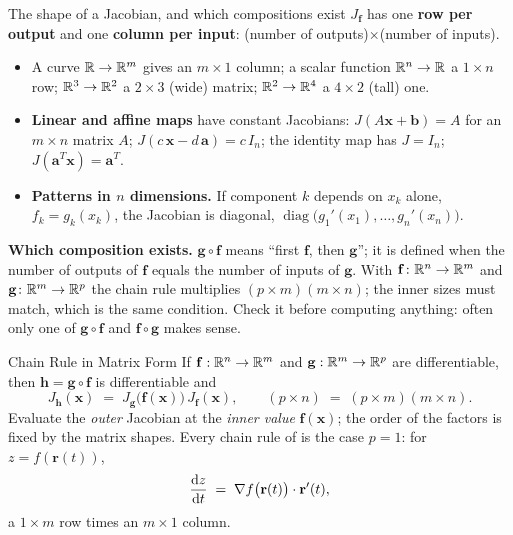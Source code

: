 \begin{rulebox}{The shape of a Jacobian, and which compositions exist}
$J_{\mathbf{f}}$ has one \textbf{row per output} and one \textbf{column per
input}: (number of outputs)$\times$(number of inputs).
\begin{itemize}[leftmargin=1.6em,itemsep=0.3ex]
  \item A curve $\mathbb{R}\to\mathbb{R}^{m}$ gives an $m\times1$ column; a scalar function
        $\mathbb{R}^{n}\to\mathbb{R}$ a $1\times n$ row; $\mathbb{R}^{3}\to\mathbb{R}^{2}$ a $2\times3$
        (wide) matrix; $\mathbb{R}^{2}\to\mathbb{R}^{4}$ a $4\times2$ (tall) one.
  \item \textbf{Linear and affine maps} have constant Jacobians:
        $J(A\mathbf{x}+\mathbf{b})=A$ for an $m\times n$ matrix $A$;
        $J(c\,\mathbf{x}-d\,\mathbf{a})=c\,I_{n}$; the identity map has
        $J=I_{n}$; $J(\mathbf{a}^{T}\mathbf{x})=\mathbf{a}^{T}$.
  \item \textbf{Patterns in $n$ dimensions.} If component $k$ depends on
        $x_{k}$ alone, $f_{k}=g_{k}(x_{k})$, the Jacobian is diagonal,
        $\operatorname{diag}\bigl(g_{1}'(x_{1}),\ldots,g_{n}'(x_{n})\bigr)$.
\end{itemize}
\textbf{Which composition exists.} $\mathbf{g}\circ\mathbf{f}$ means
``first $\mathbf{f}$, then $\mathbf{g}$''; it is defined when the number of
outputs of $\mathbf{f}$ equals the number of inputs of $\mathbf{g}$. With
$\mathbf{f}\colon\mathbb{R}^{n}\to\mathbb{R}^{m}$ and $\mathbf{g}\colon\mathbb{R}^{m}\to\mathbb{R}^{p}$ the
chain rule multiplies $(p\times m)(m\times n)$; the inner sizes must
match, which is the same condition. Check it before computing anything:
often only one of $\mathbf{g}\circ\mathbf{f}$ and $\mathbf{f}\circ\mathbf{g}$
makes sense.
\end{rulebox}

\begin{rulebox}{Chain Rule in Matrix Form}
If $\mathbf{f}:\mathbb{R}^{n}\to\mathbb{R}^{m}$ and $\mathbf{g}:\mathbb{R}^{m}\to\mathbb{R}^{p}$ are
differentiable, then $\mathbf{h}=\mathbf{g}\circ\mathbf{f}$ is
differentiable and
\[
  J_{\mathbf{h}}(\mathbf{x})
  \;=\; J_{\mathbf{g}}\bigl(\mathbf{f}(\mathbf{x})\bigr)\,
        J_{\mathbf{f}}(\mathbf{x}),
  \qquad
  (p\times n) \;=\; (p\times m)(m\times n) .
\]
Evaluate the \emph{outer} Jacobian at the \emph{inner value}
$\mathbf{f}(\mathbf{x})$; the order of the factors is fixed by the matrix
shapes. Every chain rule of  is the case $p=1$: for
$z=f(\mathbf{r}(t))$,
\[
  \frac{\mathrm{d}z}{\mathrm{d}t} \;=\; \nabla f\bigl(\mathbf{r}(t)\bigr)\cdot\mathbf{r}'(t),
\]
a $1\times m$ row times an $m\times 1$ column.
\end{rulebox}


